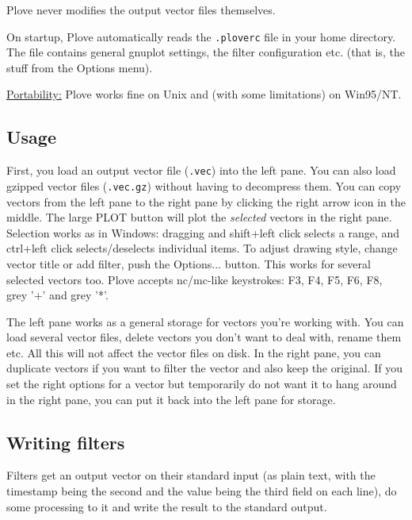 Plove never modifies the output vector files themselves.

On startup, Plove automatically reads the \texttt{.ploverc} file in
your home directory. The file contains general gnuplot settings, the
filter configuration etc.  (that is, the stuff from the Options menu).


{\underline {Portability:}} Plove works fine on Unix and (with some
limitations) on Win95/NT.





\subsection{Usage}

First, you load an output vector file (\texttt{.vec}) into the left
pane.  You can also load gzipped vector files (\texttt{.vec.gz})
without having to decompress them. You can copy vectors from the left
pane to the right pane by clicking the right arrow icon in the middle.
The large PLOT button will plot the \textit{selected} vectors in the
right pane. Selection works as in Windows: dragging and shift+left
click selects a range, and ctrl+left click selects/deselects
individual items. To adjust drawing style, change vector title or add
filter, push the Options... button. This works for several selected
vectors too. Plove accepts nc/mc-like keystrokes: F3, F4, F5, F6, F8,
grey '+' and grey '*'.


The left pane works as a general storage for vectors you're working 
with. You can load several vector files, delete vectors you don't 
want to deal with, rename them etc. All this will not affect 
the vector files on disk. In the right pane, you can duplicate 
vectors if you want to filter the vector and also keep the original. 
If you set the right options for a vector but temporarily do 
not want it to hang around in the right pane, you can put it 
back into the left pane for storage.





\subsection{Writing filters}

Filters get an output vector on their standard input (as plain 
text, with the timestamp being the second and the value being 
the third field on each line), do some processing to it and write 
the result to the standard output.


